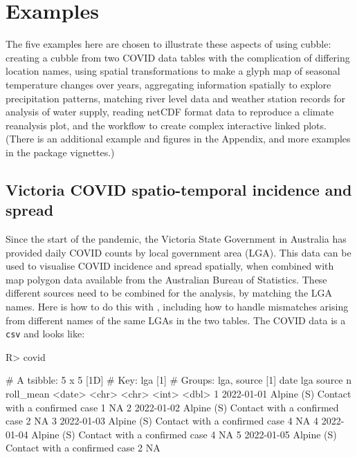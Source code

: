 \documentclass[
]{jss}
\begin{document}
\hypertarget{examples}{%
\section{Examples}\label{examples}}

The five examples here are chosen to illustrate these aspects of using cubble: creating a cubble from two COVID data tables with the complication of differing location names, using spatial transformations to make a glyph map of seasonal temperature changes over years, aggregating information spatially to explore precipitation patterns, matching river level data and weather station records for analysis of water supply, reading netCDF format data to reproduce a climate reanalysis plot, and the workflow to create complex interactive linked plots. (There is an additional example and figures in the Appendix, and more examples in the package vignettes.)

\hypertarget{covid}{%
\subsection{Victoria COVID spatio-temporal incidence and spread}\label{covid}}

Since the start of the pandemic, the Victoria State Government in Australia has provided daily COVID counts by local government area (LGA). This data can be used to visualise COVID incidence and spread spatially, when combined with map polygon data available from the Australian Bureau of Statistics. These different sources need to be combined for the analysis, by matching the LGA names. Here is how to do this with , including how to handle mismatches arising from different names of the same LGAs in the two tables. The COVID data is a \texttt{csv} and looks like:

\begin{CodeChunk}
\begin{CodeInput}
R> covid %
\end{CodeInput}
\begin{CodeOutput}
# A tsibble: 5 x 5 [1D]
# Key:       lga [1]
# Groups:    lga, source [1]
  date       lga        source                            n roll_mean
  <date>     <chr>      <chr>                         <int>     <dbl>
1 2022-01-01 Alpine (S) Contact with a confirmed case     1        NA
2 2022-01-02 Alpine (S) Contact with a confirmed case     2        NA
3 2022-01-03 Alpine (S) Contact with a confirmed case     4        NA
4 2022-01-04 Alpine (S) Contact with a confirmed case     4        NA
5 2022-01-05 Alpine (S) Contact with a confirmed case     2        NA
\end{CodeOutput}
\end{CodeChunk}
\end{document}
